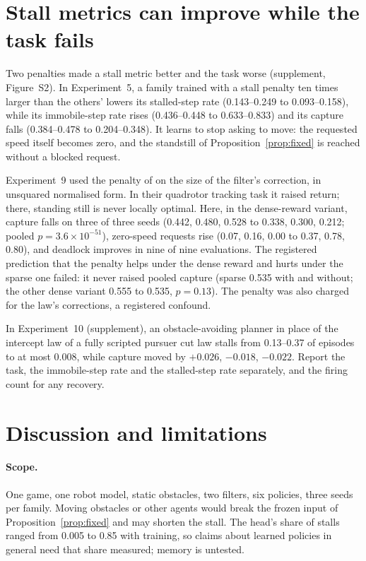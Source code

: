 \documentclass{l4dc2027}
\begin{document}
\section{Stall metrics can improve while the task fails}\label{sec:dissociations}


Two penalties made a stall metric better and the task worse (supplement, Figure~S2). In Experiment~5, a family trained with a stall penalty ten times larger than the others' lowers its stalled-step rate (0.143--0.249 to 0.093--0.158), while its immobile-step rate rises (0.436--0.448 to 0.633--0.833) and its capture falls (0.384--0.478 to 0.204--0.348). It learns to stop asking to move: the requested speed itself becomes zero, and the standstill of Proposition~\ref{prop:fixed} is reached without a blocked request.

Experiment~9 used the penalty of \citet{pizarro2025filtering} on the size of the filter's correction, in unsquared normalised form. In their quadrotor tracking task it raised return; there, standing still is never locally optimal. Here, in the dense-reward variant, capture falls on three of three seeds (0.442, 0.480, 0.528 to 0.338, 0.300, 0.212; pooled $p = 3.6\times10^{-51}$), zero-speed requests rise (0.07, 0.16, 0.00 to 0.37, 0.78, 0.80), and deadlock improves in nine of nine evaluations. The registered prediction that the penalty helps under the dense reward and hurts under the sparse one failed: it never raised pooled capture (sparse 0.535 with and without; the other dense variant 0.555 to 0.535, $p = 0.13$). The penalty was also charged for the law's corrections, a registered confound.

In Experiment~10 (supplement), an obstacle-avoiding planner in place of the intercept law of a fully scripted pursuer cut law stalls from 0.13--0.37 of episodes to at most 0.008, while capture moved by $+0.026$, $-0.018$, $-0.022$. Report the task, the immobile-step rate and the stalled-step rate separately, and the firing count for any recovery.

\section{Discussion and limitations}\label{sec:discussion}

\paragraph{Scope.} One game, one robot model, static obstacles, two filters, six policies, three seeds per family. Moving obstacles or other agents would break the frozen input of Proposition~\ref{prop:fixed} and may shorten the stall. The head's share of stalls ranged from 0.005 to 0.85 with training, so claims about learned policies in general need that share measured; memory is untested.
\end{document}

